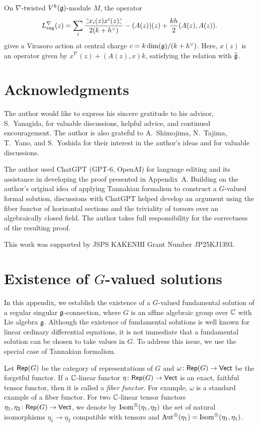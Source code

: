 \documentclass[final,reqno]{amsart}
\begin{document}
\begin{prp}\label{prp:conf str on tw aff}
    On $\nabla$-twisted $V^k(\mathfrak{g})$-module $M$, the operator
    \[
        L^\nabla_\mathrm{sug}(z)=\sum_i\frac{\,\substack{\scriptscriptstyle\circ \\ \scriptscriptstyle\circ} x_i(z)x^i(z) \substack{\scriptscriptstyle\circ \\ \scriptscriptstyle\circ\,}}{2(k+h^\vee)}-(A(z))(z)+\frac{kh}{2}(A(z),A(z)).
    \]
    gives a Virasoro action at central charge $c=k\dim(\mathfrak{g})/(k+h^\vee)$. Here, $x(z)$ is an operator given by $x^\nabla(z)+(A(z),x)k$, satisfying the relation with $\widehat{\mathfrak{g}}$. 
\end{prp}

\section*{Acknowledgments}
    The author would like to express his sincere gratitude to his advisor, S.\ Yanagida, for valuable discussions, helpful advice, and continued encouragement. The author is also grateful to A.\ Shimojima, N.\ Tajima, T.\ Yano, and S.\ Yoshida for their interest in the author's ideas and for valuable discussions.

    The author used ChatGPT (GPT-6, OpenAI) for language editing and its assistance in developing the proof presented in Appendix~A. Building on the author's original idea of applying Tannakian formalism to construct a $G$-valued formal solution, discussions with ChatGPT helped develop an argument using the fiber functor of horizontal sections and the triviality of torsors over an algebraically closed field. The author takes full responsibility for the correctness of the resulting proof.

    This work was supported by JSPS KAKENHI Grant Number JP25KJ1393.

\appendix

\section{Existence of $G$-valued solutions}\label{s: Existence of G-valued solutions}
In this appendix, we establish the existence of a $G$-valued fundamental solution of a regular singular $\mathfrak{g}$-connection, where $G$ is an affine algebraic group over $\mathbb{C}$ with Lie algebra $\mathfrak{g}$. Although the existence of fundamental solutions is well known for linear ordinary differential equations, it is not immediate that a fundamental solution can be chosen to take values in $G$. To address this issue, we use the special case of Tannakian formalism.

Let $\mathsf{Rep}(G)$ be the category of representations of $G$ and $\omega\colon \mathsf{Rep}(G)\to \mathsf{Vect}$ be the forgetful functor. If a $\mathbb{C}$-linear functor $\eta\colon\mathsf{Rep}(G)\to \mathsf{Vect}$ is an exact, faithful tensor functor, then it is called a \emph{fiber functor}. For example, $\omega$ is a standard example of a fiber functor. For two $\mathbb{C}$-linear tensor functors $\eta_1,\eta_2\colon\mathsf{Rep}(G)\to\mathsf{Vect}$, we denote by $\operatorname{Isom}^\otimes(\eta_1,\eta_2)$ the set of natural isomorphisms $\eta_1\to\eta_2$ compatible with tensors and $\operatorname{Aut}^\otimes(\eta_1)=\operatorname{Isom}^\otimes(\eta_1,\eta_1)$.  
\end{document}

